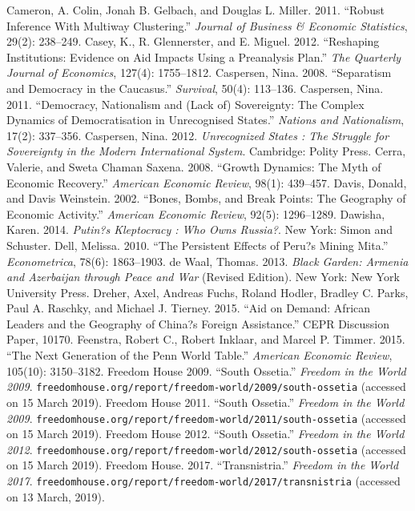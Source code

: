 \documentclass[12pt,a4paper]{article}%
\begin{document}
\begin{thebibliography}{99}
\bibitem{} Cameron, A. Colin, Jonah B. Gelbach, and Douglas L. Miller. 2011. ``Robust Inference With Multiway Clustering.'' \textit{Journal of Business \& Economic Statistics}, 29(2): 238--249.
\bibitem{} Casey, K., R. Glennerster, and E. Miguel. 2012. ``Reshaping Institutions: Evidence on Aid Impacts Using a Preanalysis Plan.'' \textit{The Quarterly Journal of Economics}, 127(4): 1755--1812.
\bibitem{} Caspersen, Nina. 2008. ``Separatism and Democracy in the Caucasus.'' \textit{Survival}, 50(4): 113--136.
\bibitem{} Caspersen, Nina. 2011. ``Democracy, Nationalism and (Lack of) Sovereignty: The Complex Dynamics of Democratisation in Unrecognised States.'' \textit{Nations and Nationalism}, 17(2): 337--356.
\bibitem{} Caspersen, Nina. 2012. \textit{Unrecognized States : The Struggle for Sovereignty in the Modern International System}. Cambridge: Polity Press.
\bibitem{} Cerra, Valerie, and Sweta Chaman Saxena. 2008. ``Growth Dynamics: The Myth of Economic Recovery.'' \textit{American Economic Review}, 98(1): 439--457.
\bibitem{} Davis, Donald, and Davis Weinstein. 2002. ``Bones, Bombs, and Break Points: The Geography of Economic Activity.'' \textit{American Economic Review}, 92(5): 1296--1289.
\bibitem{} Dawisha, Karen. 2014. \textit{Putin?s Kleptocracy : Who Owns Russia?}. New York: Simon and Schuster.
\bibitem{} Dell, Melissa. 2010. ``The Persistent Effects of Peru?s Mining Mita.'' \textit{Econometrica}, 78(6): 1863--1903.
\bibitem{} de Waal, Thomas. 2013. \textit{Black Garden: Armenia and Azerbaijan through Peace and War} (Revised Edition). New York: New York University Press.
\bibitem{} Dreher, Axel, Andreas Fuchs, Roland Hodler, Bradley C. Parks, Paul A. Raschky, and Michael J. Tierney. 2015. ``Aid on Demand: African Leaders and the Geography of China?s Foreign Assistance.'' CEPR Discussion Paper, 10170.
\bibitem{} Feenstra, Robert C., Robert Inklaar, and Marcel P. Timmer. 2015. ``The Next Generation of the Penn World Table.'' \textit{American Economic Review}, 105(10): 3150--3182.
\bibitem{} Freedom House 2009. ``South Ossetia.'' \textit{Freedom in the World 2009}. \verb!freedomhouse.org/report/freedom-world/2009/south-ossetia! (accessed on 15 March 2019).
\bibitem{} Freedom House 2011. ``South Ossetia.'' \textit{Freedom in the World 2009}. \verb!freedomhouse.org/report/freedom-world/2011/south-ossetia! (accessed on 15 March 2019).
\bibitem{} Freedom House 2012. ``South Ossetia.'' \textit{Freedom in the World 2012}. \verb!freedomhouse.org/report/freedom-world/2012/south-ossetia! (accessed on 15 March 2019).
\bibitem{} Freedom House. 2017. ``Transnistria.'' \textit{Freedom in the World 2017}. \verb!freedomhouse.org/report/freedom-world/2017/transnistria! (accessed on 13 March, 2019).

\end{thebibliography}
\end{document}

